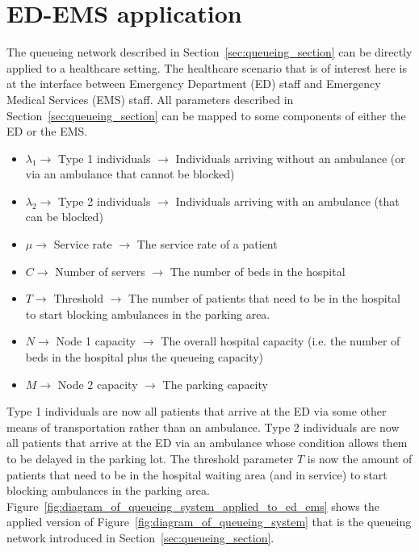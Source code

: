 \section{ED-EMS application}\label{sec:queueing_ems_ed_application}

The queueing network described in Section~\ref{sec:queueing_section} can be
directly applied to a healthcare setting.
The healthcare scenario that is of interest here is at the interface between
Emergency Department (ED) staff and Emergency Medical Services (EMS) staff.
All parameters described in Section~\ref{sec:queueing_section} can be mapped
to some components of either the ED or the EMS.

\begin{itemize}
    \item \(\lambda_1 \rightarrow\) Type 1 individuals \(\rightarrow\)
    Individuals arriving without an ambulance (or via an ambulance that cannot
    be blocked)
    \item \(\lambda_2 \rightarrow\) Type 2 individuals \(\rightarrow\)
    Individuals arriving with an ambulance (that can be blocked)
    \item \(\mu \rightarrow\) Service rate \(\rightarrow\) The service rate of a
    patient
    \item \(C \rightarrow\) Number of servers \(\rightarrow\) The number of
    beds in the hospital
    \item \(T \rightarrow\) Threshold \(\rightarrow\) The number of patients that
    need to be in the hospital to start blocking ambulances in the parking area.
    \item \(N \rightarrow\) Node 1 capacity \(\rightarrow\) The overall hospital
    capacity (i.e. the number of beds in the hospital plus the queueing
    capacity)
    \item \(M \rightarrow\) Node 2 capacity \(\rightarrow\) The parking capacity
\end{itemize}

Type 1 individuals are now all patients that arrive at the ED via
some other means of transportation rather than an ambulance.
Type 2 individuals are now all patients that arrive at the ED via an ambulance
whose condition allows them to be delayed in the parking lot.
The threshold parameter \(T\) is now the amount of patients that need to be in
the hospital waiting area (and in service) to start blocking ambulances in the
parking area.
Figure~\ref{fig:diagram_of_queueing_system_applied_to_ed_ems} shows the applied
version of Figure~\ref{fig:diagram_of_queueing_system} that is the queueing
network introduced in Section~\ref{sec:queueing_section}.

